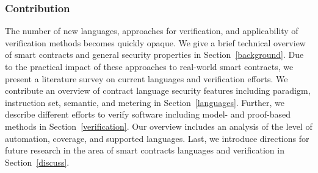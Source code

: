 \subsubsection{Contribution} The number of new languages, approaches for verification, and applicability of verification methods becomes quickly opaque. 
We give a brief technical overview of smart contracts and general security properties in Section~\ref{background}. Due to the practical impact of these approaches to real-world smart contracts, we present a literature survey on current languages and verification efforts.
We contribute an overview of contract language security features including paradigm, instruction set, semantic, and metering in Section~\ref{languages}.
Further, we describe different efforts to verify software including model- and proof-based methods in Section~\ref{verification}. Our overview includes an analysis of the level of automation, coverage, and supported languages.
Last, we introduce directions for future research in the area of smart contracts languages and verification in Section~\ref{discuss}.

